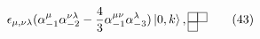 \begin{equation}
\epsilon _{\mu ,\nu \lambda }(\alpha _{-1}^{\mu }\alpha _{-2}^{\nu \lambda }-%
\frac{4}{3}\alpha _{-1}^{\mu \nu }\alpha _{-3}^{\lambda })\left\vert
0,k\right\rangle ,\raisebox{0.06in}{\fbox{\rule[0.04cm]{0.04cm}{0cm}}}%
\hspace{-0.094in}\hspace{-0.04cm}\raisebox{-.047in}{\fbox{%
\rule[0.04cm]{0.04cm}{0cm}}}\hspace{-0.006in}\hspace{-0.006in}\hspace{0.02cm}%
\raisebox{0.06in}{\fbox{\rule[0.04cm]{0.04cm}{0cm}}}  \tag{43}
\end{equation}


